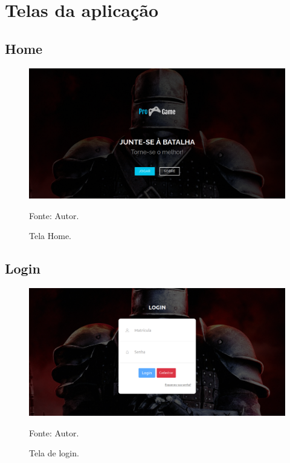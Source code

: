 \pagebreak

\section{Telas da aplicação}
    
\subsection{Home}
\begin{figure}[h]
	\centering
	\includegraphics[keepaspectratio=true,scale=0.32]{figuras/a.png}
	\caption{Tela Home.}
	Fonte: Autor.
	\label{figuraa}
\end{figure}

\subsection{Login}
\begin{figure}[h]
	\centering
	\includegraphics[keepaspectratio=true,scale=0.32]{figuras/b.png}
	\caption{Tela de login.}
	Fonte: Autor.
	\label{figurab}
\end{figure}

\pagebreak

